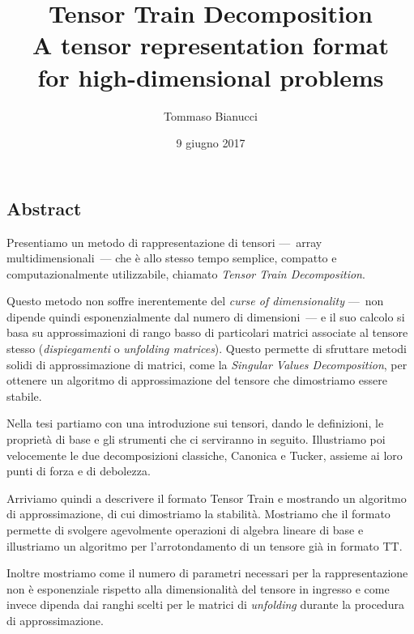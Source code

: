 \documentclass[11pt,a4paper]{article}
\title{Tensor Train Decomposition\\A tensor representation format\\for high-dimensional problems}
\author{Tommaso Bianucci}
\date{9 giugno 2017}
\begin{document}
\maketitle
\begin{center}
\subsection*{Abstract}
\end{center}

Presentiamo un metodo di rappresentazione di tensori ---~array multidimensionali~--- che è allo stesso tempo semplice, compatto e computazionalmente utilizzabile, chiamato \emph{Tensor Train Decomposition}.

Questo metodo non soffre inerentemente del \emph{curse of dimensionality} ---~non dipende quindi esponenzialmente dal numero di dimensioni~--- e il suo calcolo si basa su approssimazioni di rango basso di particolari matrici associate al tensore stesso (\emph{dispiegamenti} o \emph{unfolding matrices}).
Questo permette di sfruttare metodi solidi di approssimazione di matrici, come la \emph{Singular Values Decomposition}, per ottenere un algoritmo di approssimazione del tensore che dimostriamo essere stabile.

Nella tesi partiamo con una introduzione sui tensori, dando le definizioni, le proprietà di base e gli strumenti che ci serviranno in seguito.
Illustriamo poi velocemente le due decomposizioni classiche, Canonica e Tucker, assieme ai loro punti di forza e di debolezza.

Arriviamo quindi a descrivere il formato Tensor Train e mostrando un algoritmo di approssimazione, di cui dimostriamo la stabilità. Mostriamo che il formato permette di svolgere agevolmente operazioni di algebra lineare di base e illustriamo un algoritmo per l'arrotondamento di un tensore già in formato TT.

Inoltre mostriamo come il numero di parametri necessari per la rappresentazione non è esponenziale rispetto alla dimensionalità del tensore in ingresso e come invece dipenda dai ranghi scelti per le matrici di \emph{unfolding} durante la procedura di approssimazione.
\end{document}
